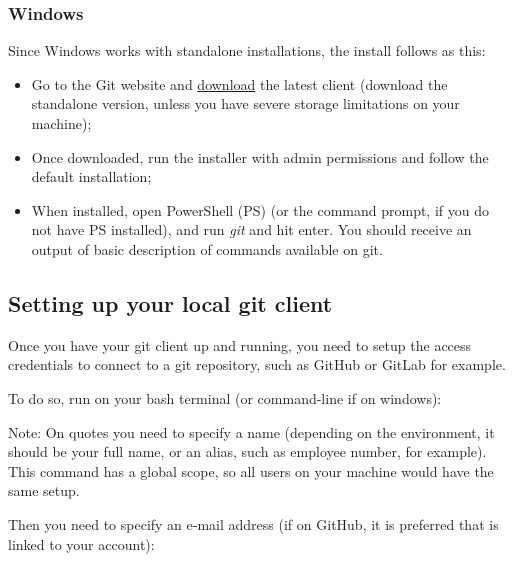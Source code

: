 \documentclass[
]{book}
\newenvironment{Shaded}{\begin{snugshade}}{\end{snugshade}}
\newcommand{\AttributeTok}[1]{\textcolor[rgb]{0.77,0.63,0.00}{#1}}
\newcommand{\ExtensionTok}[1]{#1}
\newcommand{\NormalTok}[1]{#1}
\newcommand{\StringTok}[1]{\textcolor[rgb]{0.31,0.60,0.02}{#1}}
\providecommand{\tightlist}{%
  \setlength{\itemsep}{0pt}\setlength{\parskip}{0pt}}
\begin{document}
\hypertarget{windows}{%
\subsubsection{Windows}\label{windows}}

Since Windows works with standalone installations, the install follows as this:

\begin{itemize}
\tightlist
\item
  Go to the Git website and \href{https://git-scm.com/download/win}{download} the
  latest client (download the standalone version, unless you have severe storage
  limitations on your machine);
\item
  Once downloaded, run the installer with admin permissions and follow the
  default installation;
\item
  When installed, open PowerShell (PS) (or the command prompt, if you do not
  have PS installed), and run \emph{git} and hit enter. You should receive an output of basic
  description of commands available on git.
\end{itemize}

\hypertarget{setting-up-your-local-git-client}{%
\subsection{Setting up your local git client}\label{setting-up-your-local-git-client}}

Once you have your git client up and running, you need to setup the access
credentials to connect to a git repository, such as GitHub or GitLab for example.

To do so, run on your bash terminal (or command-line if on windows):

\begin{Shaded}
\end{Shaded}

Note: On quotes you need to specify a name (depending on the environment,
it should be your full name, or an alias, such as employee number, for example). This
command has a global scope, so all users on your machine would have the same setup.

Then you need to specify an e-mail address (if on GitHub, it is preferred that
is linked to your account):
\end{document}
